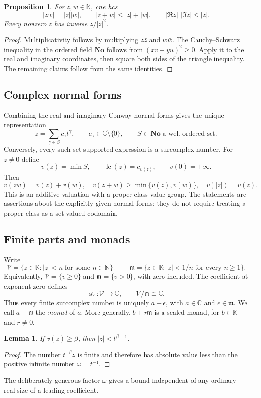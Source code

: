 \documentclass[11pt,oneside]{article}
\numberwithin{equation}{section}
\newtheorem{lemma}[theorem]{Lemma}
\newtheorem{proposition}[theorem]{Proposition}
\theoremstyle{definition}
\theoremstyle{remark}\newtheorem{remark}[theorem]{Remark}
\newcommand{\No}{\mathbf{No}}
\newcommand{\K}{\mathbb K}
\newcommand{\C}{\mathbb C}
\newcommand{\N}{\mathbb N}
\newcommand{\m}{\mathfrak m}
\newcommand{\fin}{\mathcal V}
\newcommand{\st}{\operatorname{st}}
\newcommand{\lc}{\operatorname{lc}}
\begin{document}
\begin{proposition}
For $z,w\in\K$, one has
\[
 |zw|=|z||w|,\qquad |z+w|\leq |z|+|w|,\qquad
 |\Re z|,|\Im z|\leq |z|.
\]
Every nonzero $z$ has inverse $\overline z/|z|^2$.
\end{proposition}
\begin{proof}
Multiplicativity follows by multiplying $z\bar z$ and $w\bar w$.
The Cauchy--Schwarz inequality in the ordered field $\No$ follows from
$(xv-yu)^2\geq0$. Apply it to the real and imaginary coordinates, then
square both sides of the triangle inequality. The remaining claims follow
from the same identities.
\end{proof}

\subsection{Complex normal forms}
Combining the real and imaginary Conway normal forms gives the unique
representation
\begin{equation}\label{eq:normal}
 z=\sum_{\gamma\in S} c_\gamma t^\gamma,
 \qquad c_\gamma\in\C\setminus\{0\},
 \qquad S\subset\No\text{ a well-ordered set}.
\end{equation}
Conversely, every such set-supported expression is a surcomplex number.
For $z\ne0$ define
\[
 v(z)=\min S,\qquad \lc(z)=c_{v(z)},\qquad v(0)=+\infty.
\]
Then
\[
 v(zw)=v(z)+v(w),\quad
 v(z+w)\geq\min\{v(z),v(w)\},\quad v(|z|)=v(z).
\]
This is an additive valuation with a proper-class value group. The
statements are assertions about the explicitly given normal forms; they
do not require treating a proper class as a set-valued codomain.

\subsection{Finite parts and monads}
Write
\[
 \fin=\{z\in\K:|z|<n\text{ for some }n\in\N\},\qquad
 \m=\{z\in\K:|z|<1/n\text{ for every }n\geq1\}.
\]
Equivalently, $\fin=\{v\geq0\}$ and $\m=\{v>0\}$, with zero included.
The coefficient at exponent zero defines
\[
 \st:\fin\longrightarrow\C,\qquad
 \fin/\m\cong\C.
\]
Thus every finite surcomplex number is uniquely $a+\epsilon$, with
$a\in\C$ and $\epsilon\in\m$. We call $a+\m$ the \emph{monad} of $a$.
More generally, $b+r\m$ is a scaled monad, for $b\in\K$ and $r\ne0$.

\begin{lemma}\label{lem:valuationbound}
If $v(z)\geq\beta$, then $|z|<t^{\beta-1}$.
\end{lemma}
\begin{proof}
The number $t^{-\beta}z$ is finite and therefore has absolute value less
than the positive infinite number $\omega=t^{-1}$.
\end{proof}
The deliberately generous factor $\omega$ gives a bound independent of any
ordinary real size of a leading coefficient.
\end{document}
